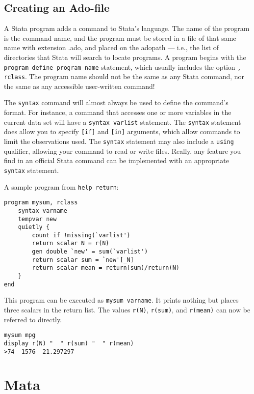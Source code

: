 \documentclass[fleqn, handout, 10pt]{beamer}
\def\lst{\lstinline}
\begin{document}
\subsection{Creating an Ado-file}

\begin{frame}[fragile]
    A Stata program adds a command to Stata’s language. The name of the program is the command name, and the program must be stored in a file of that same name with extension .ado, and placed on the adopath — i.e., the list of directories that Stata will search to locate programs. A program begins with the \lst=program define program_name= statement, which usually includes the option \lst=, rclass=. The program name should not be the same as any Stata command, nor the same as any accessible user-written command!

    The \lst=syntax= command will almost always be used to define the command’s format. For instance, a command that accesses one or more variables in the current data set will have a \lst=syntax varlist= statement. The \lst=syntax= statement does allow you to specify \lst=[if]= and \lst=[in]= arguments, which allow commands to limit the observations used. The \lst=syntax= statement may also include a \lst=using= qualifier, allowing your command to read or write files. Really, any feature you find in an official Stata command can be implemented with an appropriate \lst=syntax= statement.
\end{frame}

\begin{frame}[fragile]
    A sample program from \lst=help return=:
    \begin{lstlisting}
program mysum, rclass
    syntax varname
    tempvar new
    quietly {
        count if !missing(`varlist')
        return scalar N = r(N)
        gen double `new' = sum(`varlist')
        return scalar sum = `new'[_N]
        return scalar mean = return(sum)/return(N)
    }
end
    \end{lstlisting}
    This program can be executed as \lst=mysum varname=. It prints nothing but places three scalars in the return list. The values \lst=r(N)=, \lst=r(sum)=, and \lst=r(mean)= can now be referred to directly.
    \begin{lstlisting}
mysum mpg
display r(N) "  " r(sum) "  " r(mean)
>74  1576  21.297297
    \end{lstlisting}
\end{frame}


\section{Mata}
\end{document}
